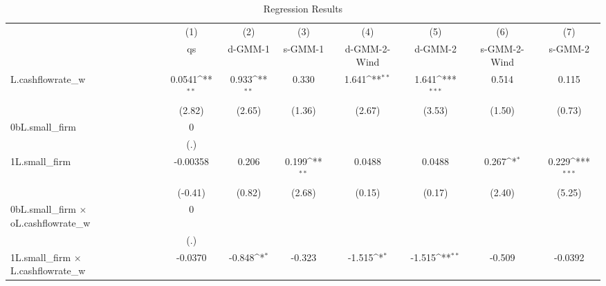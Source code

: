 \begin{table}[htbp]\centering
\def\sym#1{\ifmmode^{#1}\else\(^{#1}\)\fi}
\caption{Regression Results}
\begin{tabular}{l*{7}{c}}
\toprule
                    &\multicolumn{1}{c}{(1)}&\multicolumn{1}{c}{(2)}&\multicolumn{1}{c}{(3)}&\multicolumn{1}{c}{(4)}&\multicolumn{1}{c}{(5)}&\multicolumn{1}{c}{(6)}&\multicolumn{1}{c}{(7)}\\
                    &\multicolumn{1}{c}{qs}&\multicolumn{1}{c}{d-GMM-1}&\multicolumn{1}{c}{s-GMM-1}&\multicolumn{1}{c}{d-GMM-2-Wind}&\multicolumn{1}{c}{d-GMM-2}&\multicolumn{1}{c}{s-GMM-2-Wind}&\multicolumn{1}{c}{s-GMM-2}\\
\midrule
L.cashflowrate\_w    &      0.0541\sym{**} &       0.933\sym{**} &       0.330         &       1.641\sym{**} &       1.641\sym{***}&       0.514         &       0.115         \\
                    &      (2.82)         &      (2.65)         &      (1.36)         &      (2.67)         &      (3.53)         &      (1.50)         &      (0.73)         \\
\addlinespace
0bL.small\_firm      &           0         &                     &                     &                     &                     &                     &                     \\
                    &         (.)         &                     &                     &                     &                     &                     &                     \\
\addlinespace
1L.small\_firm       &    -0.00358         &       0.206         &       0.199\sym{**} &      0.0488         &      0.0488         &       0.267\sym{*}  &       0.229\sym{***}\\
                    &     (-0.41)         &      (0.82)         &      (2.68)         &      (0.15)         &      (0.17)         &      (2.40)         &      (5.25)         \\
\addlinespace
0bL.small\_firm $\times$ oL.cashflowrate\_w&           0         &                     &                     &                     &                     &                     &                     \\
                    &         (.)         &                     &                     &                     &                     &                     &                     \\
\addlinespace
1L.small\_firm $\times$ L.cashflowrate\_w&     -0.0370         &      -0.848\sym{*}  &      -0.323         &      -1.515\sym{*}  &      -1.515\sym{**} &      -0.509         &     -0.0392         \\

\end{tabular}
\end{table}
